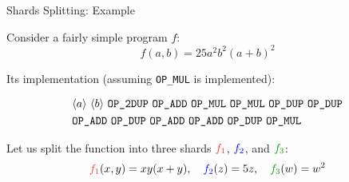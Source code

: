 \documentclass{zkdl-presentation-template}
\newcommand{\elem}[1]{\, \langle #1 \rangle \,}
\newcommand{\opcode}[1]{\, \texttt{#1} \,}
\begin{document}
    \begin{frame}{Shards Splitting: Example}
        \begin{example}
            Consider a fairly simple program $f$:
            \begin{equation*}
                f(a,b) = 25a^2b^2(a+b)^2
            \end{equation*}

            \pause Its implementation (assuming \texttt{OP\_MUL} is implemented):
            \begin{empheqboxed}
                \small
                \begin{align*}
                    &\elem{a} \elem{b} \opcode{\texttt{OP\_2DUP}} \opcode{\texttt{OP\_ADD}} \opcode{\texttt{OP\_MUL}} \opcode{\texttt{OP\_MUL}} 
                    \opcode{\texttt{OP\_DUP}} \opcode{\texttt{OP\_DUP}} \\& \opcode{\texttt{OP\_ADD}} \opcode{\texttt{OP\_DUP}} \opcode{\texttt{OP\_ADD}} \opcode{\texttt{OP\_ADD}} \opcode{\texttt{OP\_DUP}} \opcode{\texttt{OP\_MUL}}
                \end{align*}
            \end{empheqboxed}

            \pause Let us split the function into three shards $\textcolor{red!80!white}{f_1}$, $\textcolor{blue}{f_2}$, and $\textcolor{green!60!black}{f_3}$:
            \begin{align*}
                \textcolor{red!80!white}{f_1}(x,y) = xy(x+y), \quad \textcolor{blue}{f_2}(z) = 5z, \quad \textcolor{green!60!black}{f_3}(w) = w^2
            \end{align*}
        \end{example}
    \end{frame}
  
\end{document}
